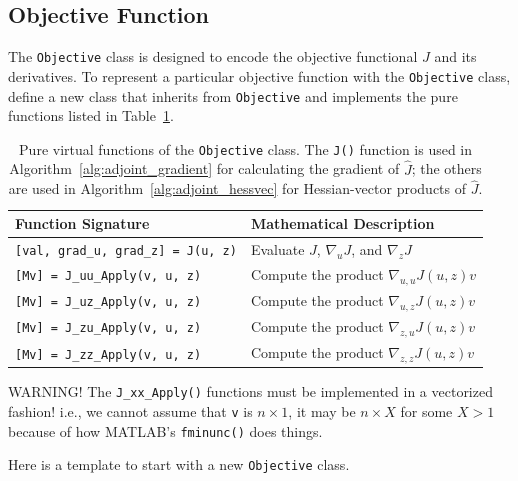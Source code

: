 \documentclass{article}
\begin{document}
\subsection*{Objective Function}

The \texttt{Objective} class is designed to encode the objective functional $J$ and its derivatives.
To represent a particular objective function with the \texttt{Objective} class, define a new class that inherits from \texttt{Objective} and implements the pure functions listed in Table~\ref{tab:objective_virtuals}.

\begin{table}[!h]
\centering
\begin{tabular}{|l|l|}
    \hline
    Function Signature & Mathematical Description
    \\ \hline
    \texttt{[val, grad\_u, grad\_z] = J(u, z)}
    & Evaluate $J$, $\nabla_u J$, and $\nabla_z J$
    \\ \hline
    \texttt{[Mv] = J\_uu\_Apply(v, u, z)}
    & Compute the product $\nabla_{u,u} J(u, z) v$
    \\
    \texttt{[Mv] = J\_uz\_Apply(v, u, z)}
    & Compute the product $\nabla_{u,z} J(u, z) v$
    \\
    \texttt{[Mv] = J\_zu\_Apply(v, u, z)}
    & Compute the product $\nabla_{z,u} J(u, z) v$
    \\
    \texttt{[Mv] = J\_zz\_Apply(v, u, z)}
    & Compute the product $\nabla_{z,z} J(u, z) v$
    \\ \hline
\end{tabular}
\caption{Pure virtual functions of the \texttt{Objective} class. The \texttt{J()} function is used in Algorithm~\ref{alg:adjoint_gradient} for calculating the gradient of $\hat{J}$; the others are used in Algorithm~\ref{alg:adjoint_hessvec} for Hessian-vector products of $\hat{J}$.}
\label{tab:objective_virtuals}
\end{table}

{\color{red}
WARNING! The \texttt{J\_xx\_Apply()} functions must be implemented in a vectorized fashion! i.e., we cannot assume that \texttt{v} is $n \times 1$, it may be $n \times X$ for some $X > 1$ because of how MATLAB's \texttt{fminunc()} does things.
}

Here is a template to start with a new \texttt{Objective} class.
\end{document}
